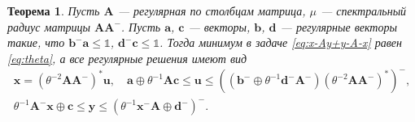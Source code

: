 \documentclass[specialist,
               substylefile = spbu.rtx,
               subf,href,colorlinks=true, 12pt]{disser}
\newtheorem{theorem}{Теорема}
\theoremstyle{definition}
\begin{document}
\begin{theorem}\label{th:column-regular}
Пусть $\bm{A}$ --- регулярная по столбцам матрица, $\mu$ --- спектральный радиус матрицы $\bm{A}\bm{A}^{-}$. Пусть $\bm{a}$, $\bm{c}$ --- векторы, $\bm{b}$, $\bm{d}$ --- регулярные векторы такие, что $\bm{b}^{-}\bm{a}\leq\mathbb{1}$, $\bm{d}^{-}\bm{c}\leq\mathbb{1}$. 
Тогда минимум в задаче \eqref{eq:x-Ay+y-A-x} равен \eqref{eq:theta}, а все регулярные решения имеют вид
\begin{equation}\label{eq:solution_xy}
\begin{gathered}
\bm{x}=(\theta^{-2}\bm{A}\bm{A}^{-})^{\ast}\bm{u},
\quad
\bm{a}
\oplus
\theta^{-1}\bm{A}\bm{c}
\leq
\bm{u}
\leq
((\bm{b}^{-}\oplus\theta^{-1}\bm{d}^{-}\bm{A}^{-})(\theta^{-2}\bm{A}\bm{A}^{-})^{\ast})^{-},\\
\theta^{-1}\bm{A}^{-}\bm{x}\oplus\bm{c}
\leq
\bm{y}
\leq
(\theta^{-1}\bm{x}^{-}\bm{A}\oplus\bm{d}^{-})^{-}.
\end{gathered}
\end{equation}
\end{theorem}
\end{document}

